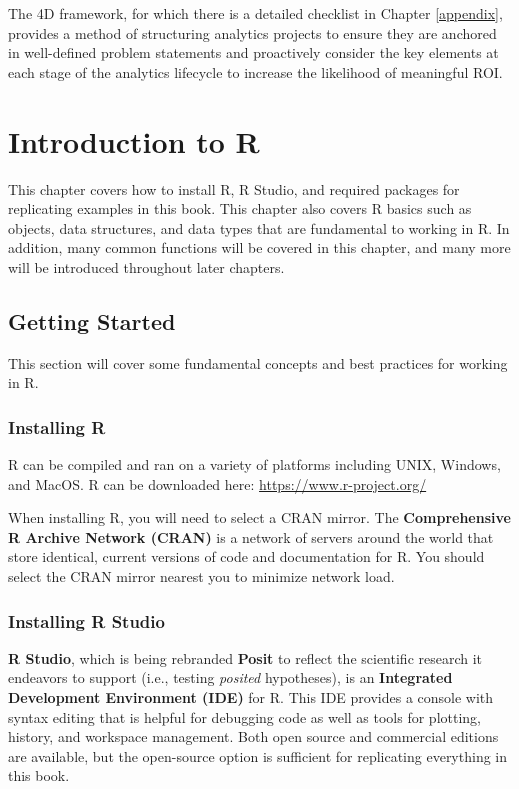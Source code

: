 \documentclass[
]{book}
\begin{document}
The 4D framework, for which there is a detailed checklist in Chapter \ref{appendix}, provides a method of structuring analytics projects to ensure they are anchored in well-defined problem statements and proactively consider the key elements at each stage of the analytics lifecycle to increase the likelihood of meaningful ROI.

\hypertarget{r-intro}{%
\chapter{Introduction to R}\label{r-intro}}

This chapter covers how to install R, R Studio, and required packages for replicating examples in this book. This chapter also covers R basics such as objects, data structures, and data types that are fundamental to working in R. In addition, many common functions will be covered in this chapter, and many more will be introduced throughout later chapters.

\hypertarget{getting-started-1}{%
\section{Getting Started}\label{getting-started-1}}

This section will cover some fundamental concepts and best practices for working in R.

\hypertarget{installing-r}{%
\subsection{Installing R}\label{installing-r}}

R can be compiled and ran on a variety of platforms including UNIX, Windows, and MacOS. R can be downloaded here: \url{https://www.r-project.org/}

When installing R, you will need to select a CRAN mirror. The \textbf{Comprehensive R Archive Network (CRAN)} is a network of servers around the world that store identical, current versions of code and documentation for R. You should select the CRAN mirror nearest you to minimize network load.

\hypertarget{installing-r-studio}{%
\subsection{Installing R Studio}\label{installing-r-studio}}

\textbf{R Studio}, which is being rebranded \textbf{Posit} to reflect the scientific research it endeavors to support (i.e., testing \emph{posited} hypotheses), is an \textbf{Integrated Development Environment (IDE)} for R. This IDE provides a console with syntax editing that is helpful for debugging code as well as tools for plotting, history, and workspace management. Both open source and commercial editions are available, but the open-source option is sufficient for replicating everything in this book.
\end{document}
